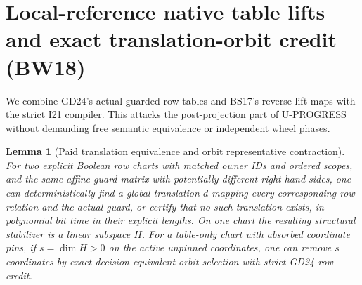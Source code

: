 \documentclass[11pt]{article}
\newtheorem{lemma}[theorem]{Lemma}
\begin{document}
\section{Local-reference native table lifts and exact translation-orbit credit (BW18)}\label{sec:bw18}
We combine GD24's actual guarded row tables and BS17's reverse lift maps with the strict I21 compiler. This attacks the post-projection part of U-PROGRESS without demanding free semantic equivalence or independent wheel phases.
\begin{lemma}[Paid translation equivalence and orbit representative contraction]\label{lem:bw18-orbit}
For two explicit Boolean row charts with matched owner IDs and ordered scopes, and the same affine guard matrix with potentially different right hand sides, one can deterministically find a global translation $d$ mapping every corresponding row relation and the actual guard, or certify that no such translation exists, in polynomial bit time in their explicit lengths. On one chart the resulting structural stabilizer is a linear subspace $H$. For a table-only chart with absorbed coordinate pins, if $s=\dim H>0$ on the active unpinned coordinates, one can remove $s$ coordinates by exact decision-equivalent orbit selection with strict GD24 row credit.
\end{lemma}
\end{document}
